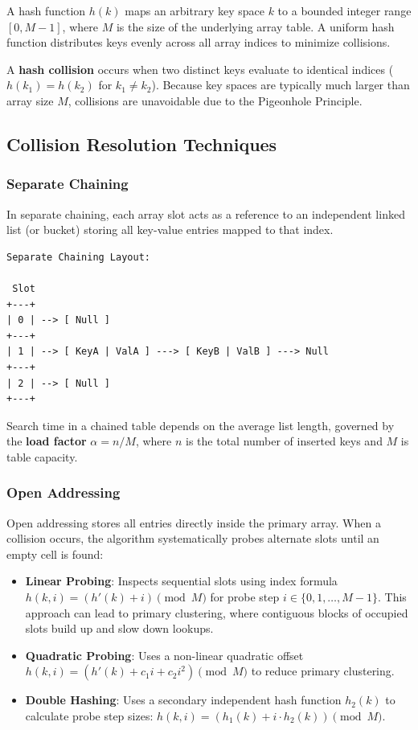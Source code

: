 \documentclass[12pt]{report}
\begin{document}
A hash function $h(k)$ maps an arbitrary key space $k$ to a bounded integer range $[0, M-1]$, where $M$ is the size of the underlying array table. A uniform hash function distributes keys evenly across all array indices to minimize collisions.

A \textbf{hash collision} occurs when two distinct keys evaluate to identical indices ($h(k_1) = h(k_2)$ for $k_1 \neq k_2$). Because key spaces are typically much larger than array size $M$, collisions are unavoidable due to the Pigeonhole Principle.

\subsection{Collision Resolution Techniques}

\subsubsection{Separate Chaining}
In separate chaining, each array slot acts as a reference to an independent linked list (or bucket) storing all key-value entries mapped to that index.

\begin{verbatim}
Separate Chaining Layout:

 Slot
+---+
| 0 | --> [ Null ]
+---+
| 1 | --> [ KeyA | ValA ] ---> [ KeyB | ValB ] ---> Null
+---+
| 2 | --> [ Null ]
+---+
\end{verbatim}

Search time in a chained table depends on the average list length, governed by the \textbf{load factor} $\alpha = n / M$, where $n$ is the total number of inserted keys and $M$ is table capacity.

\subsubsection{Open Addressing}
Open addressing stores all entries directly inside the primary array. When a collision occurs, the algorithm systematically probes alternate slots until an empty cell is found:
\begin{itemize}
    \item \textbf{Linear Probing}: Inspects sequential slots using index formula $h(k, i) = (h'(k) + i) \pmod M$ for probe step $i \in \{0, 1, \dots, M-1\}$. This approach can lead to primary clustering, where contiguous blocks of occupied slots build up and slow down lookups.
    \item \textbf{Quadratic Probing}: Uses a non-linear quadratic offset $h(k, i) = (h'(k) + c_1 i + c_2 i^2) \pmod M$ to reduce primary clustering.
    \item \textbf{Double Hashing}: Uses a secondary independent hash function $h_2(k)$ to calculate probe step sizes: $h(k, i) = (h_1(k) + i \cdot h_2(k)) \pmod M$.
\end{itemize}
\end{document}
